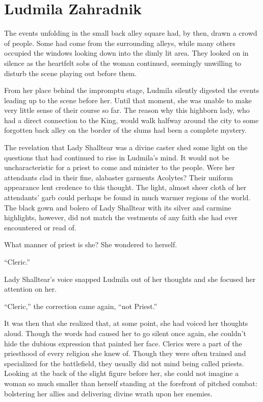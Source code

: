 \chapter{Ludmila Zahradnik}

The events unfolding in the small back alley square had, by then, drawn a crowd of people. Some had come from the surrounding alleys, while many others occupied the windows looking down into the dimly lit area. They looked on in silence as the heartfelt sobs of the woman continued, seemingly unwilling to disturb the scene playing out before them.

 

From her place behind the impromptu stage, Ludmila silently digested the events leading up to the scene before her. Until that moment, she was unable to make very little sense of their course so far. The reason why this highborn lady, who had a direct connection to the King, would walk halfway around the city to some forgotten back alley on the border of the slums had been a complete mystery.

 

The revelation that Lady Shalltear was a divine caster shed some light on the questions that had continued to rise in Ludmila’s mind. It would not be uncharacteristic for a priest to come and minister to the people. Were her attendants clad in their fine, alabaster garments Acolytes? Their uniform appearance lent credence to this thought. The light, almost sheer cloth of her attendants’ garb could perhaps be found in much warmer regions of the world. The black gown and bolero of Lady Shalltear with its silver and carmine highlights, however, did not match the vestments of any faith she had ever encountered or read of.

 

What manner of priest is she? She wondered to herself.

 

“Cleric.”

 

Lady Shalltear’s voice snapped Ludmila out of her thoughts and she focused her attention on her.

 

“Cleric,” the correction came again, “not Priest.”

 

It was then that she realized that, at some point, she had voiced her thoughts aloud. Though the words had caused her to go silent once again, she couldn't hide the dubious expression that painted her face. Clerics were a part of the priesthood of every religion she knew of. Though they were often trained and specialized for the battlefield, they usually did not mind being called priests. Looking at the back of the slight figure before her, she could not imagine a woman so much smaller than herself standing at the forefront of pitched combat: bolstering her allies and delivering divine wrath upon her enemies.


